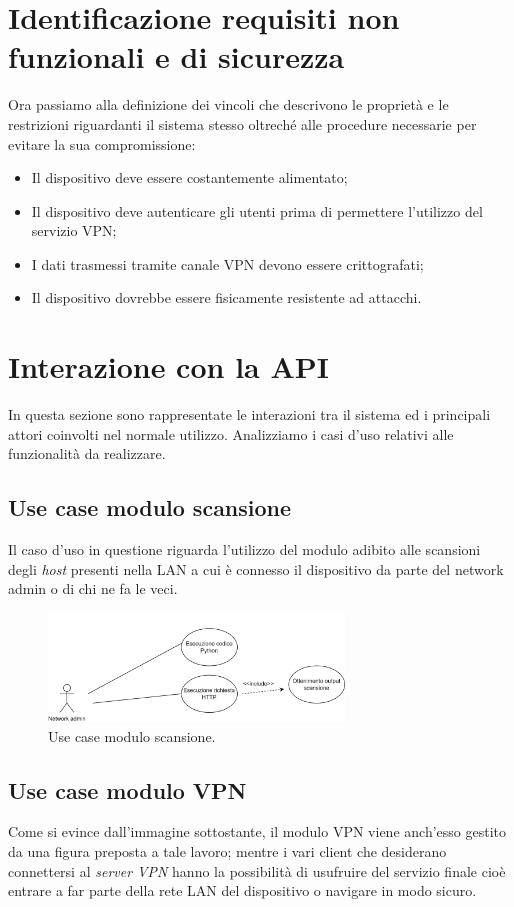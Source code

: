 \section{Identificazione requisiti non funzionali e di sicurezza}
Ora passiamo alla definizione dei vincoli che descrivono le proprietà e le restrizioni riguardanti il sistema stesso oltreché alle procedure necessarie per evitare la sua compromissione:
\begin{itemize}
    \item Il dispositivo deve essere costantemente alimentato;
    \item Il dispositivo deve autenticare gli utenti prima di permettere l'utilizzo del servizio VPN;
    \item I dati trasmessi tramite canale VPN devono essere crittografati;
    \item Il dispositivo dovrebbe essere fisicamente resistente ad attacchi.
\end{itemize}

\section{Interazione con la API}
In questa sezione sono rappresentate le interazioni tra il sistema ed i principali attori coinvolti nel normale utilizzo. Analizziamo i casi d'uso relativi alle funzionalità da realizzare.

\subsection{Use case modulo scansione}
Il caso d’uso in questione riguarda l’utilizzo del modulo adibito alle scansioni degli \emph{host} presenti nella LAN a cui è connesso il dispositivo da parte del network admin o di chi ne fa le veci.
\begin{figure}[h] \includegraphics[width=0.7\textwidth] {Tesi magistrale/capitoli/images/use case 1.png}
\centering
\caption{Use case modulo scansione.}
\end{figure}

\subsection{Use case modulo VPN}
Come si evince dall’immagine sottostante, il modulo VPN viene anch’esso gestito da una figura preposta a tale lavoro; mentre i vari client che desiderano connettersi al \emph{server VPN} hanno la possibilità di usufruire del servizio finale cioè entrare a far parte della rete LAN del dispositivo o navigare in modo sicuro.

